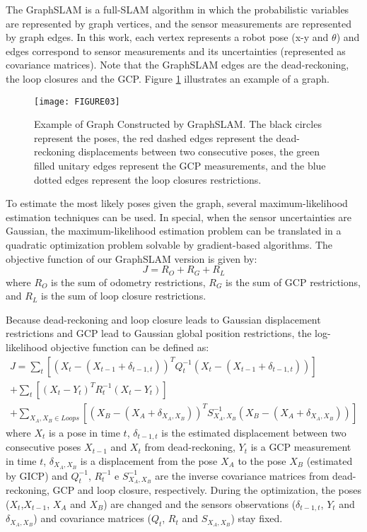 The GraphSLAM is a full-SLAM algorithm \cite{10thrun2006graph} in which the probabilistic variables are represented by graph vertices, and the sensor measurements are represented by graph edges. In this work, each vertex represents a robot pose (x-y and $\theta$) and edges correspond to sensor measurements and its uncertainties (represented as covariance matrices). Note that the GraphSLAM edges are the dead-reckoning, the loop closures and the GCP. Figure \ref{Fig::FIGURE03} illustrates an example of a graph.

\begin{figure}[ht]
    \centering
    \texttt{[image: FIGURE03]}
    \caption{Example of Graph Constructed by GraphSLAM. The black circles represent the poses, the red dashed edges represent the dead-reckoning displacements between two consecutive poses, the green filled unitary edges represent the GCP measurements, and the blue dotted edges represent the loop closures restrictions.}
    \label{Fig::FIGURE03}
\end{figure}

To estimate the most likely poses given the graph, several maximum-likelihood estimation techniques can be used. In special, when the sensor uncertainties are Gaussian, the maximum-likelihood estimation problem can be translated in a quadratic optimization problem solvable by gradient-based algorithms. The objective function of our GraphSLAM version is given by:
\begin{equation}
\label{Eq::GSLAMOBJ}
J=R_O+R_G+R_L
\end{equation}
where $R_O$ is the sum of odometry restrictions, $R_G$ is the sum of GCP restrictions, and $R_L$ is the sum of loop closure restrictions.

Because dead-reckoning and loop closure leads to Gaussian displacement restrictions and GCP lead to Gaussian global position restrictions, the log-likelihood objective function can be defined as:
\begin{equation}
\label{Eq::GSLAMlikelihoodOBJ}
\begin{array}{c}
J = \sum_{t}\left[ (X_t-(X_{t-1}+\delta_{t-1, t}))^TQ_t^{-1}(X_t-(X_{t-1}+\delta_{t-1, t}))\right]  \\
 + \sum_{t}\left[ (X_t-Y_t)^T R_t^{-1}(X_t-Y_t)\right]  \\
 + \sum_{X_A,X_B\in Loops}\left[ (X_B-(X_A+\delta_{X_A, X_B}))^TS_{X_A,X_B}^{-1}(X_B-(X_A+\delta_{X_A, X_B}))\right]
\end{array}
\end{equation}
where $X_t$ is a pose in time $t$,  $\delta_{t-1, t}$ is the estimated displacement between two consecutive poses $X_{t-1}$ and $X_t$ from dead-reckoning, $Y_t$ is a GCP measurement in time $t$, $\delta_{X_A, X_B}$ is a displacement from the pose $X_A$ to the pose $X_B$ (estimated by GICP) and $Q_t^{-1}$, $R_t^{-1}$ e $S_{X_A,X_B}^{-1}$ are the inverse covariance matrices from dead-reckoning, GCP and loop closure, respectively. During the optimization, the poses ($X_t$,$X_{t-1}$, $X_A$ and $X_B$) are changed and the sensors observations ($\delta_{t-1, t}$, $Y_t$ and $\delta_{X_A, X_B}$) and covariance matrices ($Q_t$, $R_t$ and $S_{X_A,X_B}$) stay fixed.


